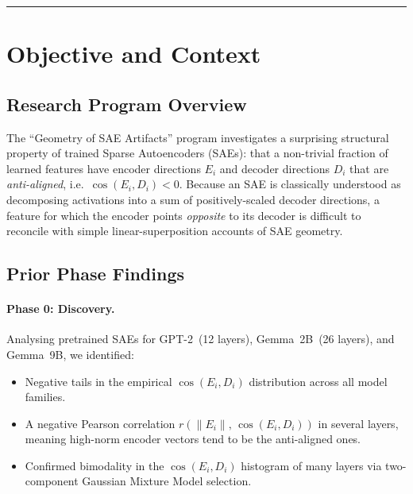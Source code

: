 \documentclass[11pt,a4paper]{article}
\newcommand{\cosED}{\cos(E_i, D_i)}
\begin{document}
\vspace{0.5em}\hrule\vspace{0.5em}
\tableofcontents
\newpage

\section{Objective and Context}
\label{sec:objective}

\subsection{Research Program Overview}

The ``Geometry of SAE Artifacts'' program investigates a surprising structural property of
trained Sparse Autoencoders (SAEs): that a non-trivial fraction of learned features have
encoder directions $E_i$ and decoder directions $D_i$ that are \emph{anti-aligned}, i.e.\
$\cosED < 0$.  Because an SAE is classically understood as decomposing activations into
a sum of positively-scaled decoder directions, a feature for which the encoder points
\emph{opposite} to its decoder is difficult to reconcile with simple linear-superposition
accounts of SAE geometry.

\subsection{Prior Phase Findings}

\paragraph{Phase 0: Discovery.}
Analysing pretrained SAEs for GPT-2~(12 layers), Gemma~2B~(26 layers), and Gemma~9B, we
identified:
\begin{itemize}[noitemsep]
  \item Negative tails in the empirical $\cosED$ distribution across all model families.
  \item A negative Pearson correlation $r(\|E_i\|,\, \cosED)$ in several layers, meaning
        high-norm encoder vectors tend to be the anti-aligned ones.
  \item Confirmed bimodality in the $\cosED$ histogram of many layers via two-component
        Gaussian Mixture Model selection.
\end{itemize}
\end{document}
